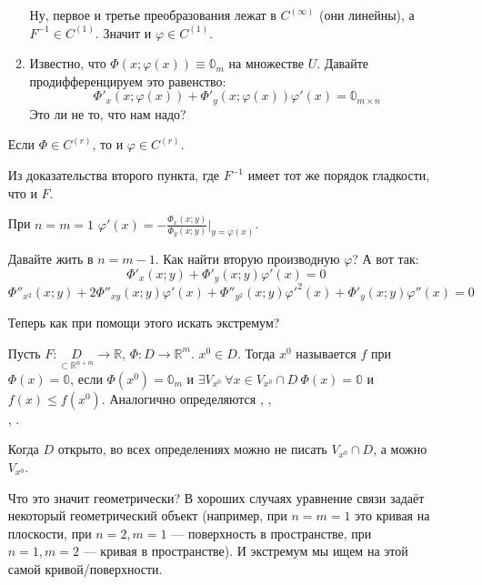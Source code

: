 \documentclass{article}
\begin{document}
\begin{itemize}
\begin{Proof}
\begin{enumerate}
                Ну, первое и третье преобразования лежат в $C^{(\infty)}$ (они линейны), а $F^{-1}\in C^{(1)}$. Значит и $\varphi\in C^{(1)}$.
                \item Известно, что $\Phi(x;\varphi(x))\equiv\mathbb0_m$ на множестве $U$. Давайте продифференцируем это равенство:
                $$
                \Phi'_x(x;\varphi(x))+\Phi'_y(x;\varphi(x))\varphi'(x)=\mathbb0_{m\times n}
                $$
                Это ли не то, что нам надо?
            \end{enumerate}
        \end{Proof}
        \thm Если $\Phi\in C^{(r)}$, то и $\varphi\in C^{(r)}$.
        \begin{Proof}
            Из доказательства второго пункта, где $F^{-1}$ имеет тот же порядок гладкости, что и $F$.
        \end{Proof}
        \thm При $n=m=1$ $\varphi'(x)=-\frac{\Phi_x(x;y)}{\Phi_y(x;y)}\bigg|_{y=\varphi(x)}$.
        \begin{Comment}
            Давайте жить в $n=m-1$. Как найти вторую производную $\varphi$? А вот так:
            $$
            \Phi'_x(x;y)+\Phi'_y(x;y)\varphi'(x)=0
            $$
            $$
            \Phi''_{x^2}(x;y)+2\Phi''_{xy}(x;y)\varphi'(x)+\Phi''_{y^2}(x;y){\varphi'}^2(x)+\Phi'_y(x;y)\varphi''(x)=0
            $$
        \end{Comment}
        \begin{Comment}
            Теперь как при помощи этого искать экстремум?
        \end{Comment}
        \dfn Пусть $F\colon\underset{\subset\mathbb R^{n+m}}D\to\mathbb R$, $\Phi\colon D\to\mathbb R^m$. $x^0\in D$. Тогда $x^0$ называется  $f$ при  $\Phi(x)=\mathbb0$, если $\Phi(x^0)=\mathbb0_m$ и $\exists V_{x^0}~\forall x\in V_{x^0}\cap D~\Phi(x)=\mathbb0$ и $f(x)\leqslant f(x^0)$.
        \dfn Аналогично определяются , ,\\, .
        \begin{Comment}
            Когда $D$ открыто, во всех определениях можно не писать $V_{x^0}\cap D$, а можно $V_{x^0}$.
        \end{Comment}
        \begin{Comment}
            Что это значит геометрически? В хороших случаях уравнение связи задаёт некоторый геометрический объект (например, при $n=m=1$ это кривая на плоскости, при $n=2,m=1$ --- поверхность в пространстве, при $n=1,m=2$ --- кривая в пространстве). И экстремум мы ищем на этой самой кривой/поверхности.\\

\end{Comment}
\end{itemize}
\end{document}
